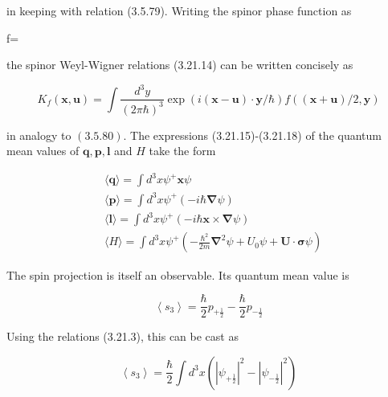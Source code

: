 \documentclass{article}
\begin{document}
in keeping with relation (3.5.79). Writing the spinor phase function as
 
f=
 
the spinor Weyl-Wigner relations (3.21.14) can be written concisely as
 
\begin{equation*}
K_{f}(\boldsymbol{x}, \boldsymbol{u})=\int \frac{d^{3} y}{(2 \pi \hbar)^{3}} \exp (i(\boldsymbol{x}-\boldsymbol{u}) \cdot \boldsymbol{y} / \hbar) f((\boldsymbol{x}+\boldsymbol{u}) / 2, \boldsymbol{y}) \tag{3.21.37}
\end{equation*}
 
in analogy to $(3.5 .80)$.
The expressions (3.21.15)-(3.21.18) of the quantum mean values of $\boldsymbol{q}, \boldsymbol{p}, \boldsymbol{l}$ and $H$ take the form
 
\begin{align*}
& \langle\boldsymbol{q}\rangle=\int d^{3} x \psi^{+} \boldsymbol{x} \psi  \tag{3.21.38}\\
& \langle\boldsymbol{p}\rangle=\int d^{3} x \psi^{+}(-i \hbar \boldsymbol{\nabla} \psi)  \tag{3.21.39}\\
& \langle\boldsymbol{l}\rangle=\int d^{3} x \psi^{+}(-i \hbar \boldsymbol{x} \times \boldsymbol{\nabla} \psi)  \tag{3.21.40}\\
& \langle H\rangle=\int d^{3} x \psi^{+}\left(-\frac{\hbar^{2}}{2 m} \boldsymbol{\nabla}^{2} \psi+U_{0} \psi+\boldsymbol{U} \cdot \boldsymbol{\sigma} \psi\right) \tag{3.21.41}
\end{align*}
 

The spin projection is itself an observable. Its quantum mean value is
 
\begin{equation*}
\left\langle s_{3}\right\rangle=\frac{\hbar}{2} p_{+\frac{1}{2}}-\frac{\hbar}{2} p_{-\frac{1}{2}} \tag{3.21.42}
\end{equation*}
 

Using the relations (3.21.3), this can be cast as
 
\begin{equation*}
\left\langle s_{3}\right\rangle=\frac{\hbar}{2} \int d^{3} x\left(\left|\psi_{+\frac{1}{2}}\right|^{2}-\left|\psi_{-\frac{1}{2}}\right|^{2}\right) \tag{3.21.43}
\end{equation*}
 
\end{document}
